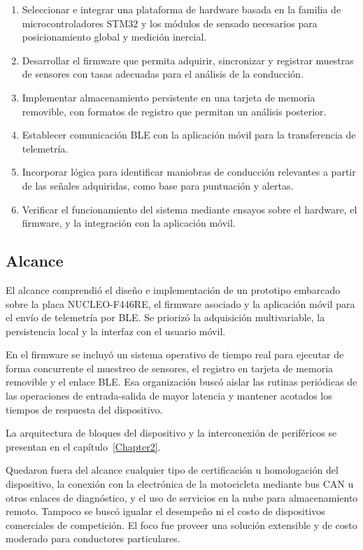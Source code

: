 \begin{enumerate}
	\item Seleccionar e integrar una plataforma de hardware basada en la familia de microcontroladores STM32 y los módulos de sensado necesarios para posicionamiento global y medición inercial.
	\item Desarrollar el firmware que permita adquirir, sincronizar y registrar muestras de sensores con tasas adecuadas para el análisis de la conducción.
	\item Implementar almacenamiento persistente en una tarjeta de memoria removible, con formatos de registro que permitan un análisis posterior.
	\item Establecer comunicación BLE con la aplicación móvil para la transferencia de telemetría.
	\item Incorporar lógica para identificar maniobras de conducción relevantes a partir de las señales adquiridas, como base para puntuación y alertas.
	\item Verificar el funcionamiento del sistema mediante ensayos sobre el hardware, el firmware, y la integración con la aplicación móvil.
\end{enumerate}

\subsection{Alcance}
\label{sec:alcance}

El alcance comprendió el diseño e implementación de un prototipo embarcado sobre la placa NUCLEO-F446RE, el firmware asociado y la aplicación móvil para el envío de telemetría por BLE. Se priorizó la adquisición multivariable, la persistencia local y la interfaz con el usuario móvil.

En el firmware se incluyó un sistema operativo de tiempo real para ejecutar de forma concurrente el muestreo de sensores, el registro en tarjeta de memoria removible y el enlace BLE. Esa organización buscó aislar las rutinas periódicas de las operaciones de entrada-salida de mayor latencia y mantener acotados los tiempos de respuesta del dispositivo.

La arquitectura de bloques del dispositivo y la interconexión de periféricos se presentan en el capítulo~\ref{Chapter2}.

Quedaron fuera del alcance cualquier tipo de certificación u homologación del dispositivo, la conexión con la electrónica de la motocicleta mediante bus CAN u otros enlaces de diagnóstico, y el uso de servicios en la nube para almacenamiento remoto. Tampoco se buscó igualar el desempeño ni el costo de dispositivos comerciales de competición. El foco fue proveer una solución extensible y de costo moderado para conductores particulares.
